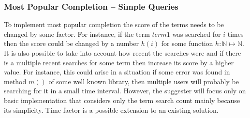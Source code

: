 \subsubsection{Most Popular Completion – Simple Queries}

To implement most popular completion the score of the terms needs to be changed by some factor. For instance, if the term
$term1$ was searched for $i$ times then the score could be changed by a number $h(i)$ for some function $h: \mathbb{N} \mapsto \mathbb{N}$.
It is also possible to take into account how recent the searches were and if there is a multiple recent searches for some
term then increase its score by a higher value. For instance, this could arise in a situation if some error was found in
method $m()$ of some well known library, then multiple users will probably be searching for it in a small time interval.
However, the suggester will focus only on basic implementation that considers only the term search count mainly because
its simplicity. Time factor is a possible extension to an existing solution.

